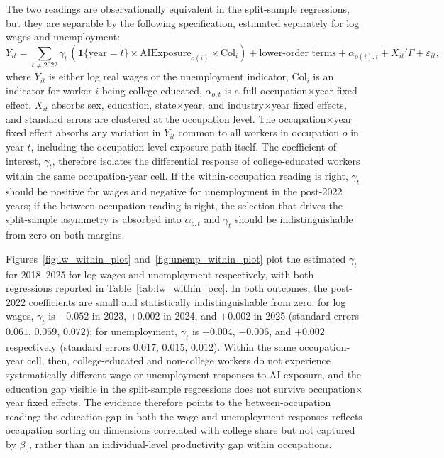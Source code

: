 \documentclass[11pt]{article}
\theoremstyle{plain}
\theoremstyle{remark}
\begin{document}
The two readings are observationally equivalent in the split-sample regressions, but they are separable by the following specification, estimated separately for log wages and unemployment:
\begin{equation}
\label{eq:within_occ}
Y_{it} = \sum_{t\ne 2022} \gamma_t\,(\mathbf{1}\{\text{year}=t\}\times \text{AIExposure}_{o(i)} \times \mathrm{Col}_i) + \text{lower-order terms} + \alpha_{o(i),t} + X_{it}'\Gamma + \varepsilon_{it},
\end{equation}
where $Y_{it}$ is either log real wages or the unemployment indicator, $\mathrm{Col}_i$ is an indicator for worker $i$ being college-educated, $\alpha_{o,t}$ is a full occupation$\times$year fixed effect, $X_{it}$ absorbs sex, education, state$\times$year, and industry$\times$year fixed effects, and standard errors are clustered at the occupation level.  The occupation$\times$year fixed effect absorbs any variation in $Y_{it}$ common to all workers in occupation $o$ in year $t$, including the occupation-level exposure path itself.  The coefficient of interest, $\gamma_t$, therefore isolates the differential response of college-educated workers within the same occupation-year cell.  If the within-occupation reading is right, $\gamma_t$ should be positive for wages and negative for unemployment in the post-2022 years; if the between-occupation reading is right, the selection that drives the split-sample asymmetry is absorbed into $\alpha_{o,t}$ and $\gamma_t$ should be indistinguishable from zero on both margins.

Figures~\ref{fig:lw_within_plot} and~\ref{fig:unemp_within_plot} plot the estimated $\gamma_t$ for 2018--2025 for log wages and unemployment respectively, with both regressions reported in Table~\ref{tab:lw_within_occ}.  In both outcomes, the post-2022 coefficients are small and statistically indistinguishable from zero: for log wages, $\gamma_t$ is $-0.052$ in 2023, $+0.002$ in 2024, and $+0.002$ in 2025 (standard errors $0.061$, $0.059$, $0.072$); for unemployment, $\gamma_t$ is $+0.004$, $-0.006$, and $+0.002$ respectively (standard errors $0.017$, $0.015$, $0.012$).  Within the same occupation-year cell, then, college-educated and non-college workers do not experience systematically different wage or unemployment responses to AI exposure, and the education gap visible in the split-sample regressions does not survive occupation$\times$year fixed effects.  The evidence therefore points to the between-occupation reading: the education gap in both the wage and unemployment responses reflects occupation sorting on dimensions correlated with college share but not captured by $\beta_o$, rather than an individual-level productivity gap within occupations.
\end{document}
